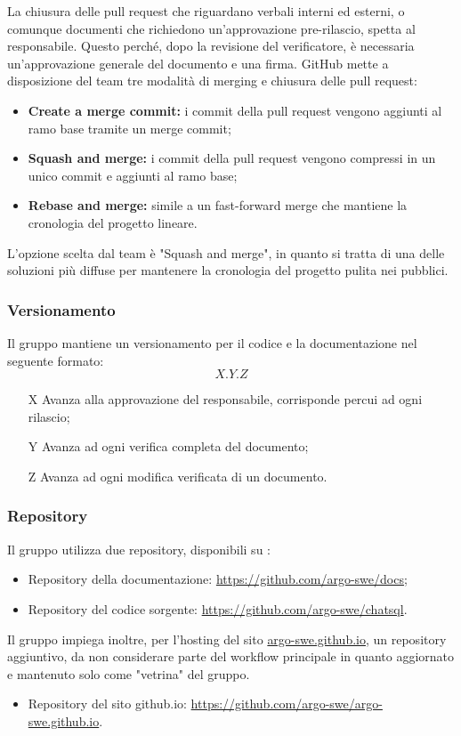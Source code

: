 \par La chiusura delle pull request che riguardano verbali interni ed esterni, o comunque documenti che richiedono un’approvazione pre-rilascio, spetta al responsabile. Questo perché, dopo la revisione del verificatore, è necessaria un’approvazione generale del documento e una firma. GitHub mette a disposizione del team tre modalità di merging e chiusura delle pull request:
\begin{itemize}
  \item \textbf{Create a merge commit:} i commit della pull request vengono aggiunti al ramo base tramite un merge commit;
  \item \textbf{Squash and merge:} i commit della pull request vengono compressi in un unico commit e aggiunti al ramo base;
  \item \textbf{Rebase and merge:} simile a un fast-forward merge che mantiene la cronologia del progetto lineare.
\end{itemize}
\par L'opzione scelta dal team è "Squash and merge", in quanto si tratta di una delle soluzioni più diffuse per mantenere la cronologia del progetto pulita nei  pubblici.

\subsubsection{Versionamento}
Il gruppo mantiene un versionamento per il codice e la documentazione nel seguente formato:
\[ X.Y.Z \]
\begin{itemize}
  \item[X] Avanza alla approvazione del responsabile, corrisponde percui ad ogni rilascio;
  \item[Y] Avanza ad ogni verifica completa del documento;
  \item[Z] Avanza ad ogni modifica verificata di un documento.
\end{itemize}

\subsubsection{Repository}
Il gruppo utilizza due repository, disponibili su :
\begin{itemize}
  \item Repository della documentazione: \href{https://github.com/argo-swe/docs}{https://github.com/argo-swe/docs};
  \item Repository del codice sorgente: \href{https://github.com/argo-swe/chatsql}{https://github.com/argo-swe/chatsql}.
\end{itemize}
Il gruppo impiega inoltre, per l'hosting del sito \href{https://argo-swe.github.io}{argo-swe.github.io}, un repository aggiuntivo, da non considerare parte del workflow principale in quanto aggiornato e mantenuto solo come "vetrina" del gruppo.
\begin{itemize}
  \item Repository del sito github.io: \href{https://github.com/argo-swe/argo-swe.github.io}{https://github.com/argo-swe/argo-swe.github.io}.
\end{itemize}

